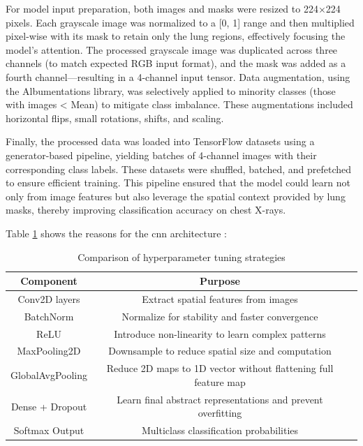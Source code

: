 \documentclass{article}
\begin{document}
For model input preparation, both images and masks were resized to 224×224 pixels. Each grayscale image was normalized to a [0, 1] range and then multiplied pixel-wise with its mask to retain only the lung regions, effectively focusing the model’s attention. The processed grayscale image was duplicated across three channels (to match expected RGB input format), and the mask was added as a fourth channel—resulting in a 4-channel input tensor. Data augmentation, using the Albumentations library, was selectively applied to minority classes (those with images < Mean) to mitigate class imbalance. These augmentations included horizontal flips, small rotations, shifts, and scaling.

Finally, the processed data was loaded into TensorFlow datasets using a generator-based pipeline, yielding batches of 4-channel images with their corresponding class labels. These datasets were shuffled, batched, and prefetched to ensure efficient training. This pipeline ensured that the model could learn not only from image features but also leverage the spatial context provided by lung masks, thereby improving classification accuracy on chest X-rays.


Table \ref{tab:cnn_architecture} shows the reasons for the cnn architecture :
\begin{table}[h]
    \centering
    \renewcommand{\arraystretch}{1.3}
    \begin{tabular}{|c|c|p{8cm}|}
        \hline
        \textbf{Component} & \textbf{Purpose} \\ \hline
        Conv2D layers & Extract spatial features from images \\ \hline
        BatchNorm & Normalize for stability and faster convergence \\ \hline
        ReLU & Introduce non-linearity to learn complex patterns \\ \hline
        MaxPooling2D & Downsample to reduce spatial size and computation \\ \hline
        GlobalAvgPooling & Reduce 2D maps to 1D vector without flattening full feature map \\ \hline
        Dense + Dropout & Learn final abstract representations and prevent overfitting \\ \hline
        Softmax Output	& Multiclass classification probabilities \\ \hline
    \end{tabular}
    \caption{Comparison of hyperparameter tuning strategies}
    \label{tab:cnn_architecture}
\end{table}
\end{document}

